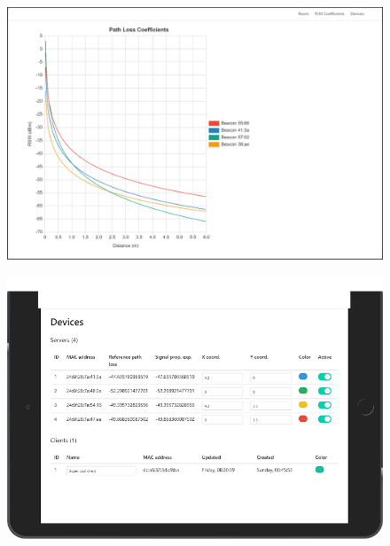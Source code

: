 \documentclass[a4paper, oneside]{ipsreport}
\begin{document}
\begin{figure}[h]
	\begin{minipage}{.5\textwidth}
		\centering
		\includegraphics[width=0.95\linewidth]{./figures/pathlosscoefficientspage.png}
		\label{fig:pathlosscoefficientspage}
	\end{minipage}
	\begin{minipage}{.5\textwidth}
		\centering
		\includegraphics[width=0.95\linewidth]{./figures/devicepage.png}
		\label{fig:devicepage}
	\end{minipage}
\end{figure}
\end{document}
